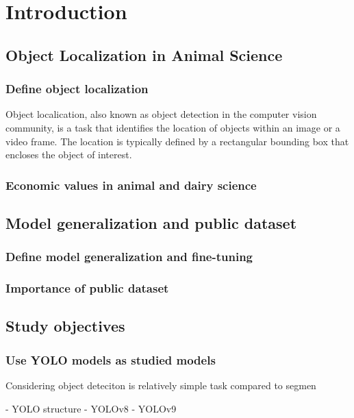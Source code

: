 \section{Introduction}

\subsection*{Object Localization in Animal Science}

\subsubsection*{Define object localization}
Object localication, also known as object detection in the computer vision community, is a task that identifies the location of objects within an image or a video frame. The location is typically defined by a rectangular bounding box that encloses the object of interest. 

\subsubsection*{Economic values in animal and dairy science}

\subsection*{Model generalization and public dataset}

\subsubsection*{Define model generalization and fine-tuning}

\subsubsection*{Importance of public dataset}


\subsection*{Study objectives}
\subsubsection*{Use YOLO models as studied models}

Considering object deteciton is relatively simple task compared to segmen


- YOLO structure
- YOLOv8
- YOLOv9
